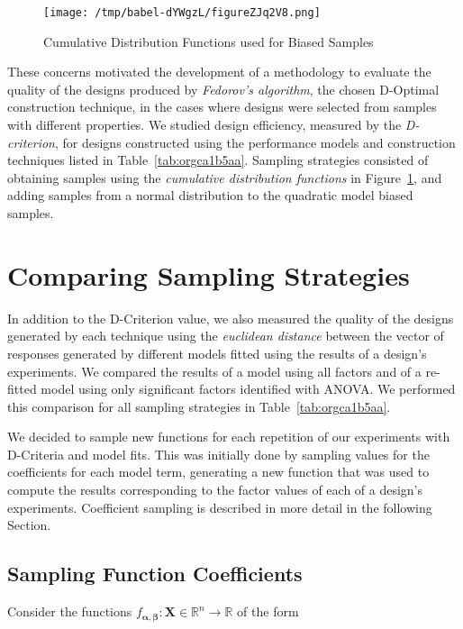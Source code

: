 \documentclass[11pt]{article}
\begin{document}
\begin{figure}[htbp]
\centering
\texttt{[image: /tmp/babel-dYWgzL/figureZJq2V8.png]}
\caption{\label{fig:orgb744699}
Cumulative Distribution Functions used for Biased Samples}
\end{figure}

These concerns motivated the development of a methodology to evaluate the
quality of the designs produced by  \emph{Fedorov's algorithm},
the chosen D-Optimal construction technique, in the cases where designs were
selected from samples with different properties. We studied design efficiency,
measured by the \emph{D-criterion}, for designs constructed using the performance
models and construction techniques listed in Table~\ref{tab:orgca1b5aa}.
Sampling strategies consisted of obtaining samples using the \emph{cumulative
distribution functions} in Figure~\ref{fig:orgb744699}, and adding samples from a
normal distribution to the quadratic model biased samples.

\section{Comparing Sampling Strategies}
\label{sec:orgc675447}
In addition to the D-Criterion value, we also measured the quality of the
designs generated by each technique using the \emph{euclidean distance} between the
vector of responses generated by different models fitted using the results of a
design's experiments. We compared the results of a model using all factors and
of a re-fitted model using only significant factors identified with ANOVA. We
performed this comparison for all sampling strategies in
Table~\ref{tab:orgca1b5aa}.

We decided to sample new functions for each repetition of our experiments with
D-Criteria and model fits. This was initially done by sampling values for the
coefficients for each model term, generating a new function that was used to
compute the results corresponding to the factor values of each of a design's
experiments. Coefficient sampling is described in more detail in the following
Section.

\subsection{Sampling Function Coefficients}
\label{sec:org688fa6c}
Consider the functions
\(f_{\boldsymbol{\alpha},\boldsymbol{\beta}}\colon\mathbf{X}\in\mathbb{R}^n\to\mathbb{R}\)
of the form
\end{document}
